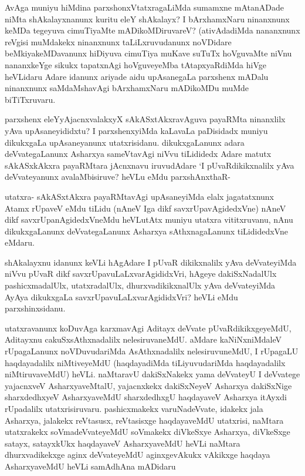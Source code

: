 
\begin{artha}
AvAga muniyu hiMdina parxshonxVtatxragaLiMda sumamxne mAtanADade niMta shAkalayxnanunx kuritu eleY shAkalayx? I bArxhamxNaru ninanxnunx keMDa tegeyuva cimuTiyaMte mADikoMDiruvareV? (ativAdadiMda nananxnunx reVgisi muMdakekx ninanxnunx taLiLxruvudanunx noVDidare beMkiyakeMDavanunx hiDiyuva cimuTiya muKave suTuTx hoVguvaMte niVnu nananxkeYge sikukx tapatxnAgi hoVguveyeMba tAtapxyaRdiMda hiVge heVLidaru Adare idanunx ariyade aidu upAsanegaLa parxshenx mADalu ninanxnunx saMdaMshavAgi bArxhamxNaru mADikoMDu muMde biTiTxruvaru. 
\end{artha}

\begin{artha}
parxshenx eleYyAjacnxvalakxyX sAkASxtAkxravAguva payaRMta ninanxlilx yAva upAsaneyididxtu? I parxshenxyiMda kaLavaLa paDisidadx muniyu dikukxgaLa upAsaneyanunx utatxrisidanu.  dikukxgaLanunx adara deVvategaLanunx Asharxya sameVtavAgi niVvu tiLididedx Adare matutx sAkASxkAkxra payaRMtara jAcnxnavu iruvudAdare `I pUvaRdikikxnalilx yAva deVvateyanunx avalaMbisiruve? heVLu eMdu parxshAnxthaR-
\end{artha}

\begin{artha}
utatxra- sAkASxtAkxra payaRMtavAgi upAsaneyiMda elalx jagatatxnunx Atamx rUpaveV eMdu tiLidu (nAneV Iga dikf savxrUpavAgidedxVne) nAneV dikf savxrUpanAgidedxVneMdu heVLutAtx muniyu utatxra vititxruvanu, nAnu dikukxgaLanunx deVvategaLanunx Asharxya sAthxnagaLanunx tiLididedxVne eMdaru. 
\end{artha}

\begin{artha}%
shAkalayxnu idanunx keVLi hAgAdare I pUvaR dikikxnalilx yAva deVvateyiMda niVvu pUvaR dikf savxrUpavuLaLxvarAgididxVri, hAgeye dakiSxNadalUlx pashicxmadalUlx, utatxradalUlx, dhurxvadikikxnalUlx yAva deVvateyiMda AyAya dikukxgaLa savxrUpavuLaLxvarAgididxVri? heVLi eMdu parxshinxsidanu.  
\end{artha}

\begin{artha}
utatxravanunx koDuvAga karxmavAgi Aditayx deVvate pUvaRdikikxgeyeMdU,  Aditayxnu cakuSxsAthxnadalilx nelesiruvaneMdU. aMdare kaNiNxniMdaleV rUpagaLanunx  noVDuvudariMda AsAthxnadalilx nelesiruvuneMdU, I rUpagaLU haqdayadalilx niMtiveyeMdU (haqdayadiMda tiLiyuvudariMda haqdayadalilx niMtiruvaveMdU) heVLi. naMtaravU dakiSxNakekx yama deVvateyU I deVvatege yajacnxveV AsharxyaveMtalU, yajacnxkekx dakiSxNeyeV Asharxya dakiSxNige sharxdedhxyeV AsharxyaveMdU sharxdedhxgU haqdayaveV Asharxya itAyxdi rUpadalilx utatxrisiruvaru. pashicxmakekx varuNadeVvate, idakekx jala Asharxya, jalakekx reVtasusx, reVtasisxge haqdayaveMdU utatxrisi, naMtara utatxrakekx soVmadeVvateyeMdU soVmakekx diVkeSxye Asharxya, diVkeSxge satayx, satayxkUkx haqdayaveV AsharxyaveMdU heVLi naMtara dhurxvadikekxge aginx deVvateyeMdU aginxgevAkukx vAkikxge haqdaya AsharxyaveMdU heVLi samAdhAna mADidaru
\end{artha}

